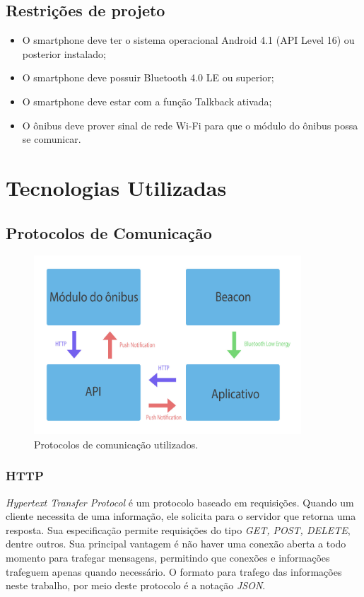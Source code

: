 \documentclass[
	12pt,				%
	oneside,			%
	a4paper,			%
	brazil				%
]{abntex2}
\begin{document}
\section{Restrições de projeto}

\begin{itemize}
\item O smartphone deve ter o sistema operacional Android 4.1 (API Level 16) ou posterior instalado;
\item O smartphone deve possuir Bluetooth 4.0 LE ou superior;
\item O smartphone deve estar com a função Talkback ativada;
\item O ônibus deve prover sinal de rede Wi-Fi para que o módulo do ônibus possa se comunicar.
\end{itemize}

\chapter{Tecnologias Utilizadas}

\section{Protocolos de Comunicação}

\begin{figure}[!h]
\centering
\includegraphics[width=10cm, center]{images/diagram_protocols}
\caption{Protocolos de comunicação utilizados.}
\label{Rotulo}
\end{figure}

\subsection{HTTP}

\textit{Hypertext Transfer Protocol} é um protocolo baseado em requisições. Quando um cliente necessita de uma informação, ele solicita para o servidor que retorna uma resposta. Sua especificação permite requisições do tipo \textit{GET, POST, DELETE}, dentre outros. Sua principal vantagem é não haver uma conexão aberta a todo momento para trafegar mensagens, permitindo que conexões e informações trafeguem apenas quando necessário. O formato para trafego das informações neste trabalho, por meio deste protocolo é a notação \textit{JSON}.
\end{document}
